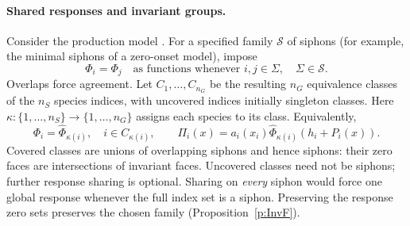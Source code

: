 \paragraph{Shared responses and invariant groups.}
Consider the production model . For a specified family $\mathcal S$ of siphons (for example, the minimal
siphons of a zero-onset model), impose
\begin{equation}\label{eq:KB-share-siphons}
 \Phi_i=\Phi_j\quad\text{as functions whenever }i,j\in \Sigma,\quad \Sigma\in\mathcal S.
\end{equation}
Overlaps force agreement. Let $C_1,\ldots,C_{n_G}$ be the resulting $n_G$ equivalence
classes of the $n_S$ species indices, with uncovered indices initially
singleton classes. Here $\kappa:\{1,\ldots,n_S\}\to\{1,\ldots,n_G\}$
assigns each species to its class. Equivalently,
\begin{equation}\label{eq:KB-shared-response}
 \Phi_i=\widehat\Phi_{\kappa(i)},\quad i\in C_{\kappa(i)},\qquad
 \Pi_i(x)=a_i(x_i)\widehat\Phi_{\kappa(i)}(h_i+P_i(x)).
\end{equation}
Covered classes are unions of overlapping siphons and hence siphons:
their zero faces are intersections of invariant faces. Uncovered classes
need not be siphons; further response sharing is optional. Sharing on
\emph{every} siphon would force one global response whenever the full index
set is a siphon. Preserving the response zero sets preserves the chosen
family (Proposition~\ref{p:InvF}).

